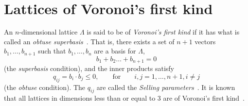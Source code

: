 \documentclass[final,leqno]{siamltex}
\begin{document}
\section{Lattices of Voronoi's first kind} \label{sec:latt-voron-first}

An $n$-dimensional lattice $\Lambda$ is said to be of \emph{Voronoi's first kind} if it has what is called an \emph{obtuse superbasis}~\cite{ConwaySloane1992_voronoi_lattice_3d_obtuse_superbases}.  That is, there exists a set of $n+1$ vectors $b_1,\dots,b_{n+1}$ such that $b_1,\dots,b_n$ are a basis for $\Lambda$,
\begin{equation}\label{eq:superbasecond}
b_1 + b_2 \dots + b_{n+1} = 0
\end{equation}
(the \emph{superbasis} condition), and the inner products satisfy
\begin{equation}\label{eq:obtusecond}
q_{ij} = b_i \cdot b_j \leq 0, \qquad \text{for} \qquad i,j = 1,\dots,n+1, i \neq j
\end{equation}
(the \emph{obtuse} condition).  The $q_{ij}$ are called the \emph{Selling parameters}~\cite{Selling1874}.  It is known that all lattices in dimensions less than or equal to $3$ are of Voronoi's first kind~\cite{ConwaySloane1992_voronoi_lattice_3d_obtuse_superbases}.  
\end{document}
